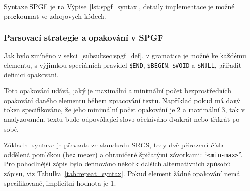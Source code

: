 \newpage
Syntaxe SPGF je na Výpise~\ref{lst:spgf_syntax}, detaily implementace je možné
prozkoumat ve zdrojových kódech.


\subsubsection{Parsovací strategie a opakování v SPGF}
Jak bylo zmíněno v sekci~\ref{subsubsec:spgf_def}, v gramatice je možné ke každému elementu,
s výjimkou speciálních pravidel \texttt{\$END}, \texttt{\$BEGIN}, \texttt{\$VOID} a \texttt{\$NULL},
přiřadit definici opakování.

Toto opakování udává, jaký je maximální a minimální počet bezprostředních opakování daného elementu během zpracování textu.
Například pokud má daný token specifikováno, že jeho minimální počet opakování je 2 a maximální 3,
tak v analyzovaném textu bude odpovídající slovo očekáváno dvakrát nebo třikrát po sobě.

Základní syntaxe je převzata ze standardu SRGS,
tedy dvě přirozená čísla oddělená pomlčkou (bez mezer) a ohraničené špičatými závorkami: \enquote{\texttt{<min-max>}}.
Pro pohodlnější zápis bylo definováno několik dalších alternativních
způsobů zápisu, viz Tabulka~\ref{tab:repeat_syntax}.
Pokud element žádné opakování nemá specifikované, implicitní hodnota je 1.

